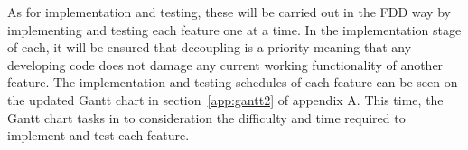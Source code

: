 As for implementation and testing, these will be carried out in the FDD way by implementing and testing each feature one at a time. In the implementation stage of each, it will be ensured that decoupling is a priority meaning that any developing code does not damage any current working functionality of another feature. The implementation and testing schedules of each feature can be seen on the updated Gantt chart in section~\ref{app:gantt2} of appendix A. This time, the Gantt chart tasks in to consideration the difficulty and time required to implement and test each feature.

